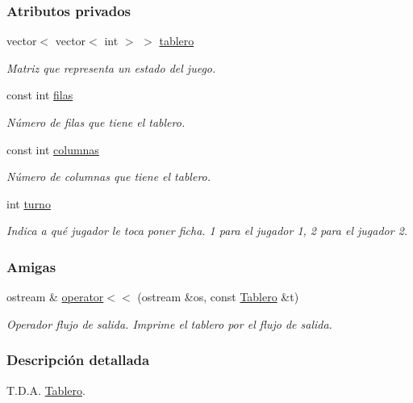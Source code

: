 \subsubsection*{Atributos privados}
\begin{DoxyCompactItemize}
\item 
vector$<$ vector$<$ int $>$ $>$ \hyperlink{classTablero_a5df607d108c0c0a14aa4f393b7f43030}{tablero}
\begin{DoxyCompactList}\small\item\em Matriz que representa un estado del juego. \end{DoxyCompactList}\item 
const int \hyperlink{classTablero_a6b1f04a8502106c33bf5469f791320e6}{filas}
\begin{DoxyCompactList}\small\item\em Número de filas que tiene el tablero. \end{DoxyCompactList}\item 
const int \hyperlink{classTablero_ac70289ec91b44d05da648770cc46801d}{columnas}
\begin{DoxyCompactList}\small\item\em Número de columnas que tiene el tablero. \end{DoxyCompactList}\item 
int \hyperlink{classTablero_ae460b4a3245da075dd381365abf158bc}{turno}
\begin{DoxyCompactList}\small\item\em Indica a qué jugador le toca poner ficha. 1 para el jugador 1, 2 para el jugador 2. \end{DoxyCompactList}\end{DoxyCompactItemize}
\subsubsection*{Amigas}
\begin{DoxyCompactItemize}
\item 
ostream \& \hyperlink{classTablero_a320d149883604290d56f857c9b5bcf1d}{operator$<$$<$} (ostream \&os, const \hyperlink{classTablero}{Tablero} \&t)
\begin{DoxyCompactList}\small\item\em Operador flujo de salida. Imprime el tablero por el flujo de salida. \end{DoxyCompactList}\end{DoxyCompactItemize}


\subsubsection{Descripción detallada}
T.\+D.\+A. \hyperlink{classTablero}{Tablero}. 

